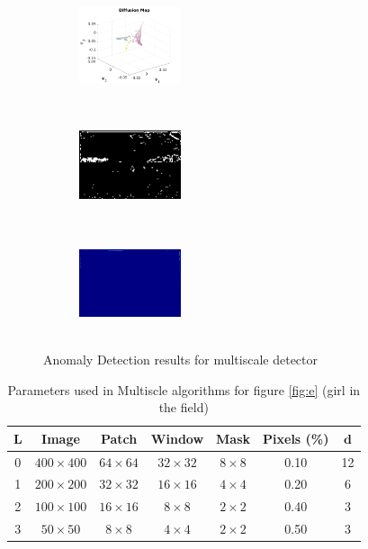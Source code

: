 \begin{figure}[t!]
\medskip
\begin{subfigure}{0.32\textwidth}
\includegraphics[height=3cm,width=3cm]{./Figures/girlf/3.png}
\caption{}
\end{subfigure}\hspace*{\fill}
\begin{subfigure}{0.32\textwidth}
\includegraphics[height=3cm,width=3cm]{./Figures/girlf/5.png}
\caption{} 
\end{subfigure}
\begin{subfigure}{0.32\textwidth}
\includegraphics[height=3cm,width=3cm]{./Figures/girlf/6.png}
\caption{} 
\end{subfigure}

\caption{Anomaly Detection results for multiscale detector} \label{R:girlf}
\end{figure}

\begin{table}
\caption{Parameters used in Multiscle algorithms for figure \ref{fig:e} (girl in the field)}
\begin{center}
 \begin{tabular}{c c c c c c c} 
  \hline\hline 
 $\mathbf{L}$ & Image & Patch & Window & Mask & Pixels (\%) & $\mathbf{d}$\\ [0.5ex]   
 \hline
 
0 & $400\times400$ & $64\times64$ & $32\times32$ & $8\times8$ & 0.10 & 12 \\

 1 & $200\times200$ & $32\times32$ & $16\times16$ & $4\times4$ & 0.20 & 6 \\ 
 
 2 & $100\times100$ & $16\times16$ & $8\times8$ & $2\times2$ & 0.40 & 3 \\
 
 3 & $50\times50$ & $8\times8$ & $4\times4$ & $2\times2$ & 0.50 & 3 \\ [1ex] 
\hline
\end{tabular}
\end{center}
\label{T:girlf}
\end{table}

